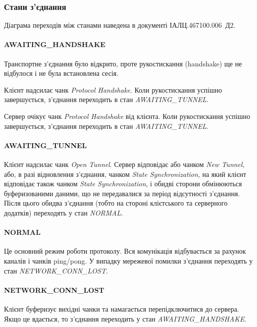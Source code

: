\subsubsection{Стани з'єднання}

Діаграма переходів між станами наведена в документі ІАЛЦ.467100.006~Д2.

\paragraph{AWAITING\_HANDSHAKE}

Транспортне з'єднання було відкрито, проте рукостискання (handshake) ще не відбулося
і не була встановлена сесія.

Клієнт надсилає чанк \emph{Protocol Handshake}. Коли рукостискання успішно
завершується, з'єднання переходить в стан \emph{AWAITING\_TUNNEL}.

Сервер очікує чанк \emph{Protocol Handshake} від клієнта. Коли рукостискання
успішно завершується, з'єднання переходить в стан \emph{AWAITING\_TUNNEL}.

\paragraph{AWAITING\_TUNNEL}

Клієнт надсилає чанк \emph{Open Tunnel}. Сервер відповідає або чанком \emph{New
Tunnel}, або, в разі відновлення з'єднання, чанком \emph{State
Synchronization}, на який клієнт відповідає також чанком \emph{State
Synchronization}, і обидві сторони обмінюються буферизованими даними, що не
передавалися за період відсутності з'єднання. Після цього обидва з'єднання
(тобто на стороні клієтського та серверного додатків) переходять у стан
\emph{NORMAL}.

\paragraph{NORMAL}

Це основний режим роботи протоколу. Вся комунікація відбувається за рахунок
каналів і чанків ping/pong. У випадку мережевої помилки з'єднання переходять у
стан \emph{NETWORK\_CONN\_LOST}.

\paragraph{NETWORK\_CONN\_LOST}

Клієнт буферизує вихідні чанки та намагається перепідключитися до сервера.
Якщо це вдається, то з'єднання переходить у стан \emph{AWAITING\_HANDSHAKE}.

